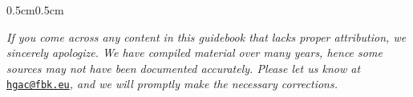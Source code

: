 \begin{adjustwidth}{0.5cm}{0.5cm}
	\begin{center}
		{\small\textit{If you come across any content in this guidebook that lacks proper attribution, we sincerely apologize. We have compiled material over many years, hence some sources may not have been documented accurately. Please let us know at} \ul{\texttt{hgac@fbk.eu}}\textit{, and we will promptly make the necessary corrections.}}
	\end{center}

\end{adjustwidth}
\vspace*{\fill}

\clearpage
